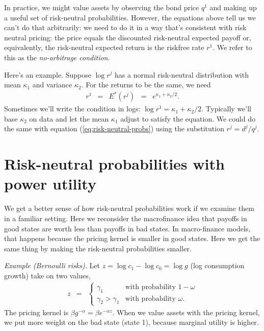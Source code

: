 \documentclass[11pt]{article}
\begin{document}
In practice, we might value assets by observing the bond price $q^1$
and making up a useful set of risk-neutral probabilities.
However, the equations above tell us we can't do that arbitrarily:
we need to do it in a way that's consistent with risk neutral pricing:
the price equals the discounted risk-neutral expected payoff or, equivalently,
the risk-neutral expected return is the riskfree rate $r^1$.
We refer to this as the {\it no-arbitrage condition\/}.

Here's an example.
Suppose $ \log r^j $ has a normal risk-neutral distribution with mean
$\kappa_1$ and variance $\kappa_2$.
For the returns to be the same, we need
\begin{eqnarray*}
    r^1 &=& E^*(r^j) \;\;=\;\; e^{\kappa_1 + \kappa_2/2} .
\end{eqnarray*}
Sometimes we'll write the condition in logs:
$ \log r^1 = \kappa_1 + \kappa_2/2$.
Typically we'll base $\kappa_2$ on data and let the mean $\kappa_1$ adjust to satisfy the equation.
We could do the same with equation (\ref{eq:risk-neutral-probs})
using the substitution $ r^j = d^j/q^j$.




\section{Risk-neutral probabilities with power utility}

We get a better sense of how risk-neutral probabilities work
if we examine them in a familiar setting.
Here we reconsider the macrofinance idea that payoffs in good states are
worth less than payoffs in bad states.
In macro-finance models, that happens because the pricing kernel
is smaller in good states.
Here we get the same thing by making the risk-neutral probabilities smaller.


{\it Example (Bernoulli risks).\/}
Let $ z = \log c_1 - \log c_0 = \log g$ (log consumption growth)
take on two values,
\begin{eqnarray*}
    z &=&   \left\{
            \begin{array}{ll}
            \gamma_1 & \mbox{with probability } 1-\omega \\
            \gamma_2 > \gamma_1 & \mbox{with probability } \omega .
            \end{array}
            \right.
\end{eqnarray*}
The pricing kernel is $\beta g^{-\alpha} = \beta e^{-\alpha z}$.
When we value assets with the pricing kernel, we put more weight
on the bad state (state 1), because marginal utility is higher.
\end{document}
